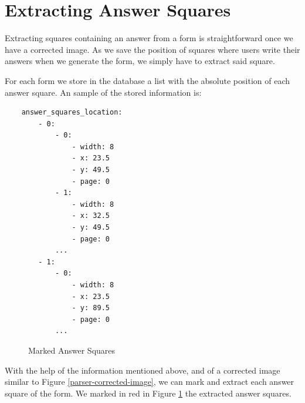\documentclass[11pt, a4paper]{report}
\begin{document}
\section{Extracting Answer Squares}

Extracting squares containing an answer from a form is straightforward once we have a corrected image. As we save the position of squares where users write their answers when we generate the form, we simply have to extract said square.

For each form we store in the database a list with the absolute position of each answer square. An sample of the stored information is:

\begin{verbatim}
    answer_squares_location:
        - 0:
            - 0:
                - width: 8
                - x: 23.5
                - y: 49.5
                - page: 0
            - 1:
                - width: 8
                - x: 32.5
                - y: 49.5
                - page: 0
            ...
        - 1:
            - 0:
                - width: 8
                - x: 23.5
                - y: 89.5
                - page: 0
            ...
\end{verbatim}

\begin{figure}[!h]
	\centering
	\caption{Marked Answer Squares}
	\label{answer-squares-red}
\end{figure}


With the help of the information mentioned above, and of a corrected image similar to Figure \ref{parser-corrected-image}, we can mark and extract each answer square of the form. We marked in red in Figure \ref{answer-squares-red} the extracted answer squares.
\end{document}
